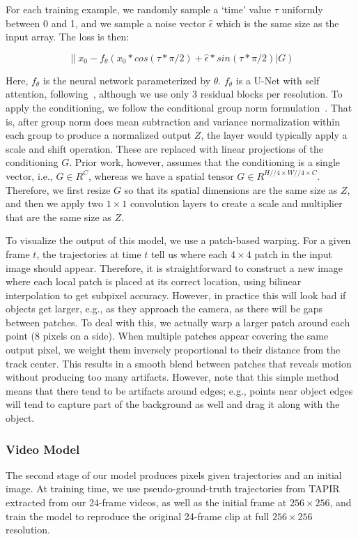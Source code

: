 \documentclass[10pt,twocolumn,letterpaper]{article}
\begin{document}
For each training example, we randomly sample a `time' value $\tau$ uniformly between 0 and 1, and we sample a noise vector $\hat{\epsilon}$ which is the same size as the input array.  The loss is then:

$$\|x_0-f_\theta(x_0*cos(\tau*\pi/2) + \hat{\epsilon}*sin(\tau*\pi/2)|G)$$

Here, $f_\theta$ is the neural network parameterized by $\theta$.  $f_{\theta}$ is a U-Net with self attention, following~\cite{song2020score}, although we use only 3 residual blocks per resolution.  To apply the conditioning, we follow the conditional group norm formulation~\cite{ho2020denoising,perez2018film}.  That is, after group norm does mean subtraction and variance normalization within each group to produce a normalized output $Z$, the layer would typically apply a scale and shift operation.  These are replaced with linear projections of the conditioning $G$.  Prior work, however, assumes that the conditioning is a single vector, i.e., $G\in R^{C}$, whereas we have a spatial tensor $G\in R^{H//4\times W//4 \times C}$.  Therefore, we first resize $G$ so that its spatial dimensions are the same size as $Z$, and then we apply two $1 \times 1$ convolution layers to create a scale and multiplier that are the same size as $Z$.

To visualize the output of this model, we use a patch-based warping.  For a given frame $t$, the trajectories at time $t$ tell us where each $4\times 4$ patch in the input image should appear.  Therefore, it is straightforward to construct a new image where each local patch is placed at its correct location, using bilinear interpolation to get subpixel accuracy.  However, in practice this will look bad if objects get larger, e.g., as they approach the camera, as there will be gaps between patches.  To deal with this, we actually warp a larger patch around each point ($8$ pixels on a side).  When multiple patches appear covering the same output pixel, we weight them inversely proportional to their distance from the track center.  This results in a smooth blend between patches that reveals motion without producing too many artifacts.  However, note that this simple method means that there tend to be artifacts around edges; e.g., points near object edges will tend to capture part of the background as well and drag it along with the object.

\subsubsection{Video Model}
The second stage of our model produces pixels given trajectories and an initial image.  At training time, we use pseudo-ground-truth trajectories from TAPIR extracted from our 24-frame videos, as well as the initial frame at $256\times 256$, and train the model to reproduce the original 24-frame clip at full $256\times 256$ resolution.  
\end{document}
